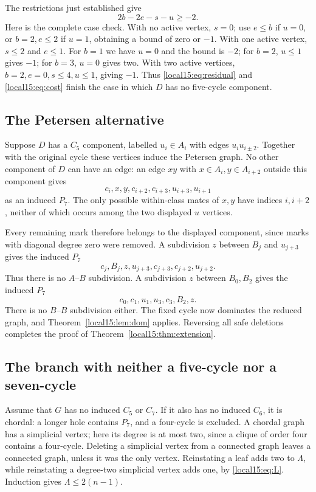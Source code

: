 \documentclass[11pt,a4paper]{article}
\theoremstyle{definition}\newtheorem{definition}[theorem]{Definition}
\theoremstyle{remark}\newtheorem{remark}[theorem]{Remark}
\begin{document}
The restrictions just established give
\begin{equation}\label{local15:eq:cost}
 2b-2e-s-u\ge-2.
\end{equation}
Here is the complete case check. With no active vertex, $s=0$; use $e\le b$
if $u=0$, or $b=2,e\le2$ if $u=1$, obtaining a bound of zero or $-1$.
With one active vertex, $s\le2$ and $e\le1$. For $b=1$ we have $u=0$
and the bound is $-2$; for $b=2$, $u\le1$ gives $-1$; for $b=3$, $u=0$
gives two. With two active vertices, $b=2,e=0,s\le4,u\le1$, giving $-1$.
Thus \eqref{local15:eq:residual} and \eqref{local15:eq:cost} finish the case in which
$D$ has no five-cycle component.

\subsection{The Petersen alternative}
Suppose $D$ has a $C_5$ component, labelled $u_i\in A_i$ with edges
$u_iu_{i\pm2}$. Together with the original cycle these vertices induce
the Petersen graph. No other component of $D$ can have an edge: an edge
$xy$ with $x\in A_i,y\in A_{i+2}$ outside this component gives
\[
 c_i,x,y,c_{i+2},c_{i+3},u_{i+3},u_{i+1}
\]
as an induced $P_7$. The only possible within-class mates of $x,y$
have indices $i,i+2$, neither of which occurs among the two displayed
$u$ vertices.

Every remaining mark therefore belongs to the displayed component,
since marks with diagonal degree zero were removed. A subdivision $z$
between $B_j$ and $u_{j+3}$ gives the induced $P_7$
\[
 c_j,B_j,z,u_{j+3},c_{j+3},c_{j+2},u_{j+2}.
\]
Thus there is no $A$--$B$ subdivision. A subdivision $z$ between $B_0,B_2$
gives the induced $P_7$
\[
 c_0,c_1,u_1,u_3,c_3,B_2,z.
\]
There is no $B$--$B$ subdivision either. The fixed cycle now dominates
the reduced graph, and Theorem~\ref{local15:lem:dom} applies. Reversing all safe
deletions completes the proof of Theorem~\ref{local15:thm:extension}.


\subsection{The branch with neither a five-cycle nor a seven-cycle}
Assume that $G$ has no induced $C_5$ or $C_7$. If it also has no induced
$C_6$, it is chordal: a longer hole contains $P_7$, and a four-cycle is
excluded. A chordal graph has a simplicial vertex; here its degree is
at most two, since a clique of order four contains a four-cycle.
Deleting a simplicial vertex from a connected graph leaves a connected
graph, unless it was the only vertex. Reinstating a leaf adds two to
$\Lambda$, while reinstating a degree-two simplicial vertex adds one, by
\eqref{local15:eq:L}. Induction gives $\Lambda\le2(n-1)$.
\end{document}
